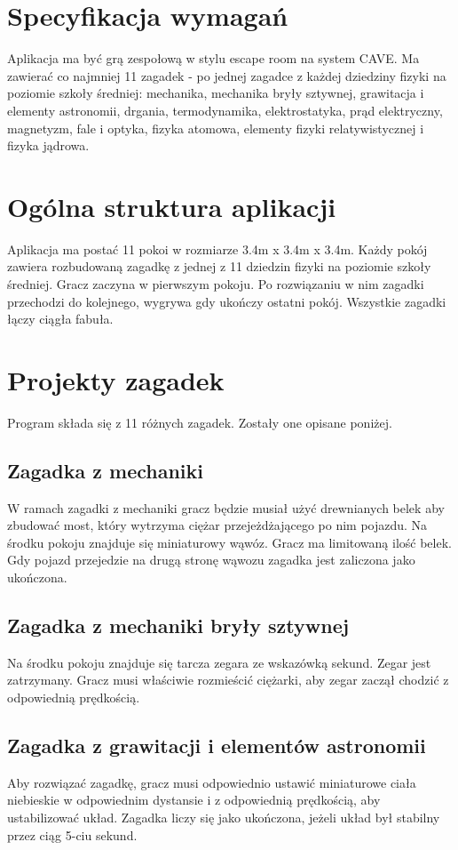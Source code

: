 \section{Specyfikacja wymagań}
Aplikacja ma być grą zespołową w stylu escape room na system CAVE. Ma zawierać co najmniej 11 zagadek - po jednej zagadce z każdej dziedziny fizyki na poziomie szkoły średniej: mechanika, mechanika bryły sztywnej, grawitacja i elementy astronomii, drgania, termodynamika, elektrostatyka, prąd elektryczny, magnetyzm, fale i optyka, fizyka atomowa, elementy fizyki relatywistycznej i fizyka jądrowa.

\section{Ogólna struktura aplikacji}
Aplikacja ma postać 11 pokoi w rozmiarze 3.4m x 3.4m x 3.4m. Każdy pokój zawiera rozbudowaną zagadkę z jednej z 11 dziedzin fizyki na poziomie szkoły średniej.
Gracz zaczyna w pierwszym pokoju. Po rozwiązaniu w nim zagadki przechodzi do kolejnego, wygrywa gdy ukończy ostatni pokój. Wszystkie zagadki łączy ciągła fabuła.

\section{Projekty zagadek}

Program składa się z 11 różnych zagadek. Zostały one opisane poniżej.

\subsection{Zagadka z mechaniki}
W ramach zagadki z mechaniki gracz będzie musiał użyć drewnianych belek aby zbudować most, który wytrzyma ciężar przejeżdżającego po nim pojazdu. Na środku pokoju znajduje się miniaturowy wąwóz. Gracz ma limitowaną ilość belek. Gdy pojazd przejedzie na drugą stronę wąwozu zagadka jest zaliczona jako ukończona.

\subsection{Zagadka z mechaniki bryły sztywnej}
Na środku pokoju znajduje się tarcza zegara ze wskazówką sekund. Zegar jest zatrzymany. Gracz musi właściwie rozmieścić ciężarki, aby zegar zaczął chodzić z odpowiednią prędkością.

\subsection{Zagadka z grawitacji i elementów astronomii}
Aby rozwiązać zagadkę, gracz musi odpowiednio ustawić miniaturowe ciała niebieskie w odpowiednim dystansie i z odpowiednią prędkością, aby ustabilizować układ. Zagadka liczy się jako ukończona, jeżeli układ był stabilny przez ciąg 5-ciu sekund.

